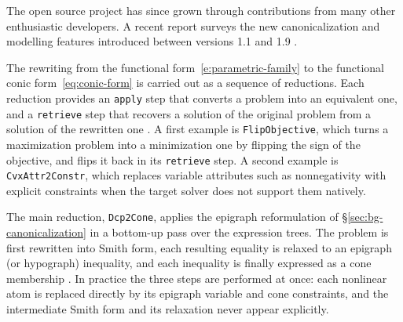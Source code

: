 The open source project has since grown through contributions from many other enthusiastic
developers. A recent report surveys the new canonicalization and modelling features
introduced between versions 1.1 and 1.9 \cite{zhang2026cvxpy}.

The rewriting from the functional form~\eqref{e:parametric-family} to the functional conic
form~\eqref{eq:conic-form}
is carried out as a sequence of reductions. Each reduction provides an
\texttt{apply} step that converts a problem into an equivalent one, and a \texttt{retrieve}
step that recovers a solution of the original problem from a solution of the rewritten one
\cite{agrawal2018rewriting}.
A first example is \texttt{FlipObjective}, which turns a maximization problem into a
minimization one by flipping the sign of the objective, and flips it back in its
\texttt{retrieve} step.
A second example is \texttt{CvxAttr2Constr}, which replaces variable attributes such as
nonnegativity with explicit constraints when the target solver does not support them natively.

The main reduction, \texttt{Dcp2Cone}, applies the epigraph reformulation of
\S\ref{sec:bg-canonicalization} in a bottom-up pass over the expression trees. The problem is
first rewritten into Smith form,
each resulting equality is relaxed to an epigraph (or hypograph) inequality, and each
inequality is finally expressed as a cone membership \cite{smith1996, grant2008graph}.
In practice the three steps are performed at once: each nonlinear atom is replaced directly by its
epigraph variable and cone constraints, and the intermediate Smith form and its relaxation
never appear explicitly.

